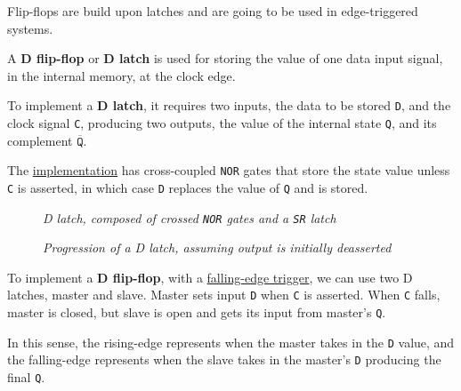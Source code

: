 \documentclass[11pt]{article}
\begin{document}
Flip-flops are build upon latches and are going to be used in edge-triggered systems.

A \textbf{D flip-flop} or \textbf{D latch} is used for storing the value of one data input signal, in the internal memory, at the clock edge.

To implement a \textbf{D latch}, it requires two inputs, the data to be stored \texttt{D}, and the clock signal \texttt{C}, producing two outputs, the value of the internal state \texttt{Q}, and its complement \(\overline{\mathtt{Q}}\).

The \hyperref[]{implementation} has cross-coupled \texttt{NOR} gates that store the state value unless \texttt{C} is asserted, in which case \texttt{D} replaces the value of \texttt{Q} and is stored.

\pagebreak

\begin{figure}[htbp]
    \centering
    \caption{\textit{D latch, composed of crossed \texttt{NOR} gates and a \texttt{SR} latch}}
    \vspace{1em}
    \centering
    \caption{\textit{Progression of a D latch, assuming output is initially deasserted}}
\end{figure}

To implement a \textbf{D flip-flop}, with a \underline{falling-edge trigger}, we can use two D latches, master and slave. Master sets input \texttt{D} when \texttt{C} is asserted. When \texttt{C} falls, master is closed, but slave is open and gets its input from master's \texttt{Q}.

In this sense, the rising-edge represents when the master takes in the \texttt{D} value, and the falling-edge represents when the slave takes in the master's \texttt{D} producing the final \texttt{Q}.
\end{document}
